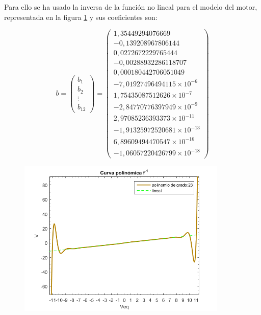 \documentclass[a4paper]{article}
\begin{document}
Para ello se ha usado la inversa de la función no lineal para el modelo del motor, representada en la figura \ref{polinomioB} y sus coeficientes son:

\begin{equation}
b =
\left( \begin{array}{c}
b_1 \\
b_2 \\
\vdots \\
b_12
\end{array} \right)
=
\left( \begin{array}{c}
1,35449294076669 \\
-0,139208967806144 \\
0,0272672229765444 \\
-0,00288932286118707 \\
0,000180442706051049 \\
-7,01927496494115\times 10^{-6} \\
1,75435087512626\times 10^{-7} \\
-2,84770776397949\times 10^{-9} \\
2,97085236393373\times 10^{-11} \\
-1,91325972520681\times 10^{-13} \\
6,89609494470547\times 10^{-16} \\
-1,06057220426799\times 10^{-18}

\end{array} \right)
\end{equation}

\begin{figure}[htbp]
	\begin{center}
		\includegraphics[width=10cm]{curva_polinomica_inversa}
		\caption{}
		\label{polinomioB}
	\end{center}
\end{figure}
\end{document}
